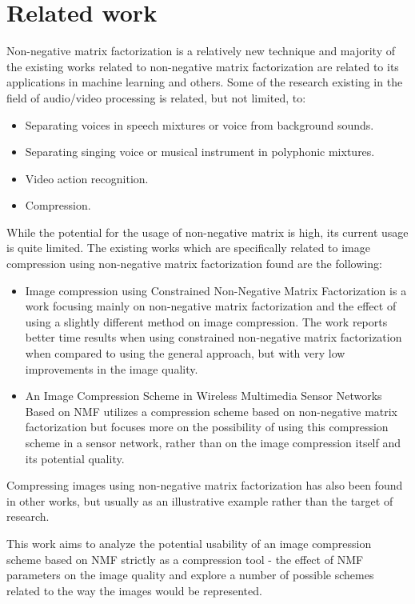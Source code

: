 \documentclass[thesis=M,english]{FITthesis}[2012/10/20]
\begin{document}
\section{Related work}
Non-negative matrix factorization is a relatively new technique and majority of
the existing works related to non-negative matrix factorization are related to
its applications in machine learning and others. Some of the research existing
in the field of audio/video processing is related, but not limited, to:
\begin{itemize}
  \item Separating voices in speech mixtures or voice from background sounds. \cite{audioseparate}
  \item Separating singing voice or musical instrument in polyphonic mixtures. \cite{audioseparate2}
  \item Video action recognition. \cite{videorecognition}
  \item Compression.
\end{itemize}

While the potential for the usage of non-negative matrix is high, its current usage
is quite limited. The existing works which are specifically related to image compression
using non-negative matrix factorization found are the following:
\begin{itemize}
  \item Image compression using Constrained Non-Negative Matrix Factorization \cite{imgcnmf}
  is a work focusing mainly on non-negative matrix factorization and the effect of using
  a slightly different method on image compression. The work reports better time results when using constrained
  non-negative matrix factorization when compared to using the general approach, but with very low improvements
  in the image quality.
  \item An Image Compression Scheme in Wireless Multimedia Sensor Networks Based on NMF \cite{wirelessnmf}
  utilizes a compression scheme based on non-negative matrix factorization but focuses more on
  the possibility of using this compression scheme in a sensor network, rather than on the
  image compression itself and its potential quality.
\end{itemize}

Compressing images using non-negative matrix factorization has also been found in other works, but
usually as an illustrative example rather than the target of research.

This work aims to analyze the potential usability of an image compression scheme based on NMF
strictly as a compression tool - the effect of NMF parameters on the image quality and explore
a number of possible schemes related to the way the images would be represented.
\end{document}
